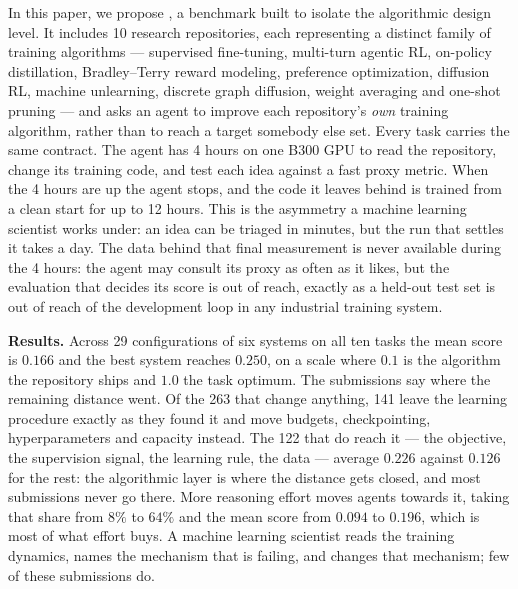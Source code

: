 In this paper, we propose \textbf{\ai{}}, a benchmark built to isolate the algorithmic design level. It includes 10
research repositories, each representing a distinct family of training algorithms --- supervised fine-tuning,
multi-turn agentic RL, on-policy distillation, Bradley--Terry reward modeling, preference
optimization, diffusion RL, machine unlearning, discrete graph diffusion, weight averaging and
one-shot pruning --- and asks an agent to improve each repository's \emph{own} training algorithm,
rather than to reach a target somebody else set. Every task carries the same contract. The agent
has 4 hours on one B300 GPU to read the repository, change its training code, and test each idea
against a fast proxy metric. When the 4 hours are up the agent stops, and the code it leaves
behind is trained from a clean start for up to 12 hours. This is the asymmetry a machine learning
scientist works under: an idea can be triaged in minutes, but the run that settles it takes a day.
The data behind that final measurement is never available during the 4 hours: the agent may
consult its proxy as often as it likes, but the evaluation that decides its score is out of reach,
exactly as a held-out test set is out of reach of the development loop in any industrial training
system.

\textbf{Results.} Across 29 configurations of six systems on all ten tasks the mean
score is $0.166$ and the best system reaches $0.250$, on a scale where $0.1$ is the
algorithm the repository ships and $1.0$ the task optimum. The submissions say
where the remaining distance went. Of the 263 that change anything, 141 leave the
learning procedure exactly as they found it and move budgets, checkpointing,
hyperparameters and capacity instead. The 122 that do reach it --- the objective,
the supervision signal, the learning rule, the data --- average $0.226$ against
$0.126$ for the rest: the algorithmic layer is where the distance gets closed, and
most submissions never go there. More reasoning effort moves agents towards it,
taking that share from $8\%$ to $64\%$ and the mean score from $0.094$ to $0.196$,
which is most of what effort buys. A machine learning scientist reads the training
dynamics, names the mechanism that is failing, and changes that mechanism; few of
these submissions do.

